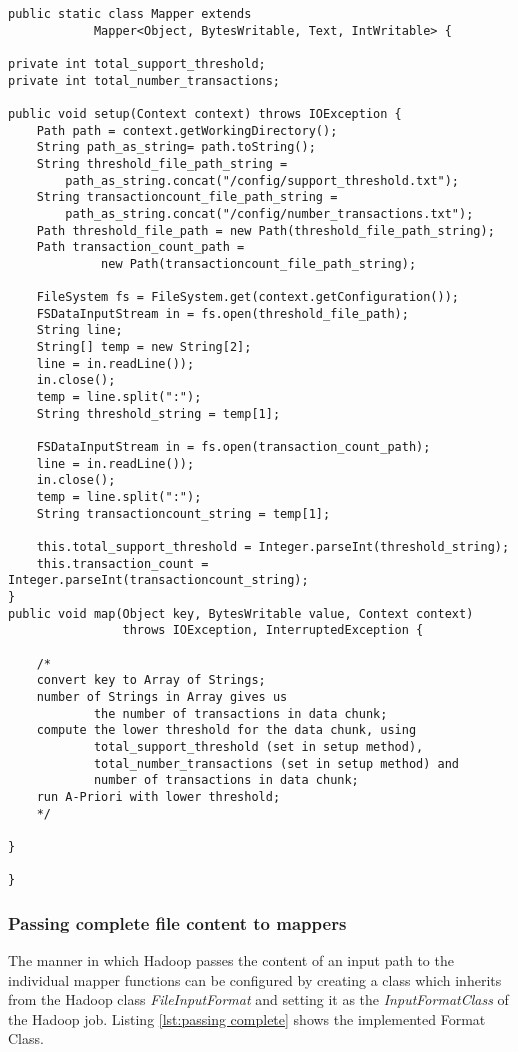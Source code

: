 \begin{lstlisting}[caption={setting the threshold parameter},captionpos=b,label={lst:setting parameter}]
public static class Mapper extends
			Mapper<Object, BytesWritable, Text, IntWritable> {
			
private int total_support_threshold;
private int total_number_transactions;

public void setup(Context context) throws IOException {
	Path path = context.getWorkingDirectory();
	String path_as_string= path.toString();
	String threshold_file_path_string = 
		path_as_string.concat("/config/support_threshold.txt");
	String transactioncount_file_path_string = 
		path_as_string.concat("/config/number_transactions.txt");	
	Path threshold_file_path = new Path(threshold_file_path_string);
	Path transaction_count_path =
			 new Path(transactioncount_file_path_string);
			 
	FileSystem fs = FileSystem.get(context.getConfiguration());
	FSDataInputStream in = fs.open(threshold_file_path);
	String line;
	String[] temp = new String[2];
	line = in.readLine());
	in.close();
	temp = line.split(":");
	String threshold_string = temp[1];
	
	FSDataInputStream in = fs.open(transaction_count_path);
	line = in.readLine());
	in.close();
	temp = line.split(":");
	String transactioncount_string = temp[1];
	
	this.total_support_threshold = Integer.parseInt(threshold_string);
	this.transaction_count = Integer.parseInt(transactioncount_string);
}
public void map(Object key, BytesWritable value, Context context)
				throws IOException, InterruptedException {
				
	/*
	convert key to Array of Strings;
	number of Strings in Array gives us 
			the number of transactions in data chunk;
	compute the lower threshold for the data chunk, using
			total_support_threshold (set in setup method),
			total_number_transactions (set in setup method) and	
			number of transactions in data chunk;
	run A-Priori with lower threshold;
	*/
				
}

}
\end{lstlisting}

\subsubsection{Passing complete file content to mappers}\label{complete content}
The manner in which Hadoop passes the content of an input path to the individual mapper functions can be configured by creating a class which inherits from the Hadoop class \textit{FileInputFormat} and setting it as the \textit{InputFormatClass} of the Hadoop job. Listing \ref{lst:passing complete} shows the implemented Format Class.

